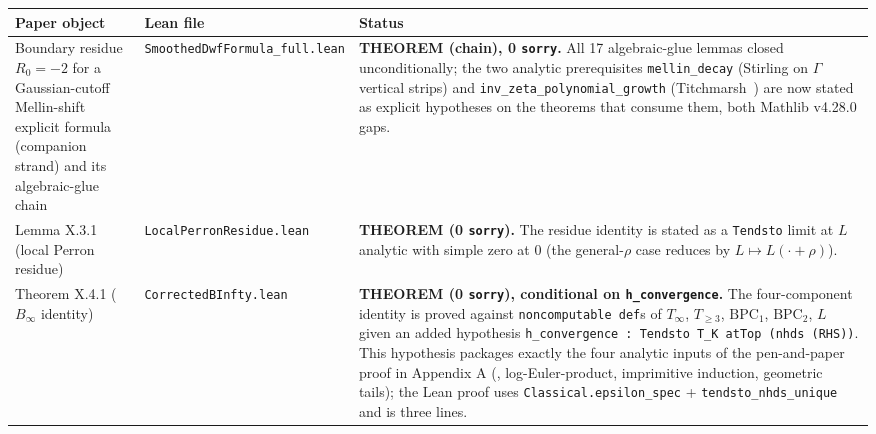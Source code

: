{\def\LTcaptype{none} %
\begin{longtable}[]{@{}
  >{\raggedright\arraybackslash}p{}
  >{\raggedright\arraybackslash}p{}
  >{\raggedright\arraybackslash}p{}@{}}
\toprule\noalign{}
\begin{minipage}[b]{\linewidth}\raggedright
Paper object
\end{minipage} & \begin{minipage}[b]{\linewidth}\raggedright
Lean file
\end{minipage} & \begin{minipage}[b]{\linewidth}\raggedright
Status
\end{minipage} \\
\midrule\noalign{}
\endhead
\bottomrule\noalign{}
\endlastfoot
Boundary residue \(R_0 = -2\) for a Gaussian-cutoff Mellin-shift explicit formula (companion strand) and its algebraic-glue chain & \texttt{SmoothedDwfFormula\_full.lean} & \textbf{THEOREM (chain), 0 \texttt{sorry}.} All 17 algebraic-glue lemmas closed unconditionally; the two analytic prerequisites \texttt{mellin\_decay} (Stirling on \(\Gamma\) vertical strips) and \texttt{inv\_zeta\_polynomial\_growth} (Titchmarsh~\cite[\S\,3.11]{Titchmarsh1986RZF}) are now stated as explicit hypotheses on the theorems that consume them, both Mathlib v4.28.0 gaps. \\
Lemma X.3.1 (local Perron residue) & \texttt{LocalPerronResidue.lean} & \textbf{THEOREM (0 \texttt{sorry}).} The residue identity is stated as a \texttt{Tendsto} limit at \(L\) analytic with simple zero at \(0\) (the general-\(\rho\) case reduces by \(L \mapsto L(\cdot + \rho)\)). \\
Theorem X.4.1 (\(B_\infty\) identity) & \texttt{CorrectedBInfty.lean} & \textbf{THEOREM (0 \texttt{sorry}), conditional on \texttt{h\_convergence}.} The four-component identity is proved against \texttt{noncomputable\ def}s of \(T_\infty\), \(T_{\ge 3}\), \(\mathrm{BPC}_1\), \(\mathrm{BPC}_2\), \(L\) given an added hypothesis \texttt{h\_convergence\ :\ Tendsto\ T\_K\ atTop\ (nhds\ (RHS))}. This hypothesis packages exactly the four analytic inputs of the pen-and-paper proof in Appendix A (\cite{Akatsuka2017EulerProduct}, log-Euler-product, imprimitive induction, geometric tails); the Lean proof uses \texttt{Classical.epsilon\_spec} + \texttt{tendsto\_nhds\_unique} and is three lines. \\

\end{longtable}}
